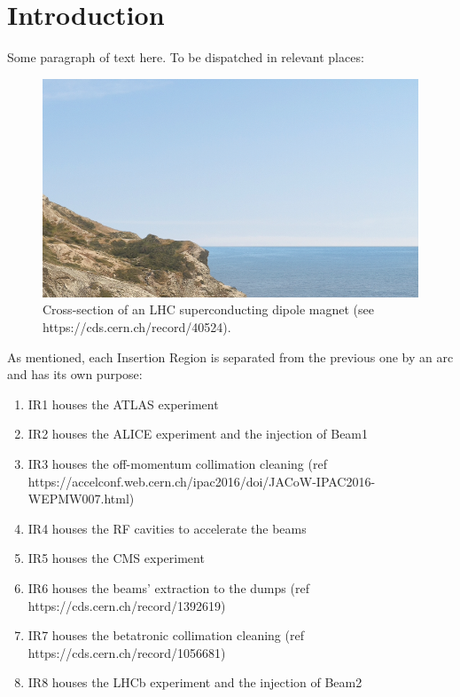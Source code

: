 \chapter{Introduction}

\label{Introduction} %


Some paragraph of text here.
To be dispatched in relevant places:

\begin{figure}[h]
  \centering
  \includegraphics*[width=0.5\linewidth]{Figures/placeholder.png}
  \caption{Cross-section of an LHC superconducting dipole magnet (see https://cds.cern.ch/record/40524).}
  \label{figure:lhc_dipole_crosssection}
\end{figure}

As mentioned, each Insertion Region is separated from the previous one by an arc and has its own purpose:
\begin{enumerate}
    \item IR1 houses the ATLAS experiment
    \item IR2 houses the ALICE experiment and the injection of Beam1
    \item IR3 houses the off-momentum collimation cleaning (ref https://accelconf.web.cern.ch/ipac2016/doi/JACoW-IPAC2016-WEPMW007.html)
    \item IR4 houses the RF cavities to accelerate the beams
    \item IR5 houses the CMS experiment
    \item IR6 houses the beams' extraction to the dumps (ref https://cds.cern.ch/record/1392619)
    \item IR7 houses the betatronic collimation cleaning (ref https://cds.cern.ch/record/1056681)
    \item IR8 houses the LHCb experiment and the injection of Beam2
\end{enumerate}

